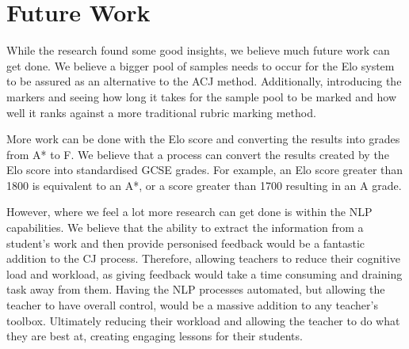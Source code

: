 

\section{Future Work}
\label{sec:conclusion_future_wk}

While the research found some good insights, we believe much future work can get done. We believe a bigger pool of samples needs to occur for the Elo system to be assured as an alternative to the ACJ method. Additionally, introducing the markers and seeing how long it takes for the sample pool to be marked and how well it ranks against a more traditional rubric marking method.


More work can be done with the Elo score and converting the results into grades from A* to F. We believe that a process can convert the results created by the Elo score into standardised GCSE grades. For example, an Elo score greater than 1800 is equivalent to an A*, or a score greater than 1700 resulting in an A grade.

However, where we feel a lot more research can get done is within the NLP capabilities. We believe that the ability to extract the information from a student's work and then provide personised feedback would be a fantastic addition to the CJ process. Therefore, allowing teachers to reduce their cognitive load and workload, as giving feedback would take a time consuming and draining task away from them. Having the NLP processes automated, but allowing the teacher to have overall control, would be a massive addition to any teacher's toolbox. Ultimately reducing their workload and allowing the teacher to do what they are best at, creating engaging lessons for their students.
